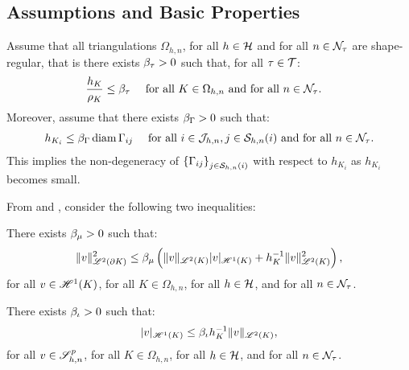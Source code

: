 \newpage
\subsection{Assumptions and Basic Properties}

Assume that all triangulations $\Omega_{h, n}$, for all $h \in \mathcal{H}$ and for all $n \in \mathcal{N}_{\tau}$ are shape-regular, that is there exists $\beta_{\tau} > 0$ such that, for all $\tau \in \mathcal{T}$:
\begin{align}
    \frac{h_K}{\rho_K} &\leq \beta_{\tau} &\text{ for all } K \in \Omega_{h, n} \text{ and for all } n \in \mathcal{N}_{\tau}. \label{equation:ass_h}
&\end{align}
Moreover, assume that there exists $\beta_{\Gamma} > 0$ such that:
\begin{align}
    h_{K_i} &\leq \beta_{\Gamma} \operatorname*{diam} \Gamma_{ij} &\text{ for all } i \in \mathcal{J}_{h, n}, j \in \mathcal{S}_{h, n}(i) \text{ and for all } n \in \mathcal{N}_{\tau}. \label{equation:ass_hd}
\end{align}
This implies the non-degeneracy of $\left\{ \Gamma_{ij} \right\}_{j \in \mathcal{S}_{h, n}(i)}$ with respect to $h_{K_i}$ as $h_{K_i}$ becomes small.

From \cite{Dolejší2002} and \cite{Ciarlet1978}, consider the following two inequalities:

\begin{lemma}
    There exists $\beta_{\mu} > 0$ such that:
    \begin{align}
        \lVert v \rVert_{\mathscr{L}^{2}(\partial K)}^2 \leq \beta_{\mu} \left( \lVert v \rVert_{\mathscr{L}^{2}(K)} \lvert v \rvert_{\mathscr{H}^{1}(K)} + h_K^{-1} \lVert v \rVert_{\mathscr{L}^{2}(K)}^2 \right),
    \end{align}
    for all $v \in \mathscr{H}^{1}(K)$, for all $K \in \Omega_{h, n}$, for all $h \in \mathcal{H}$, and for all $n \in \mathcal{N}_{\tau}$.
\end{lemma}

\begin{lemma}
    There exists $\beta_{\iota} > 0$ such that:
    \begin{align}
        \lvert v \rvert_{\mathscr{H}^{1}(K)} \leq \beta_{\iota} h_K^{-1} \lVert v \rVert_{\mathscr{L}^{2}(K)},
    \end{align}
    for all $v \in \mathscr{S}^p_{h, n}$, for all $K \in \Omega_{h, n}$, for all $h \in \mathcal{H}$, and for all $n \in \mathcal{N}_{\tau}$.
\end{lemma}

